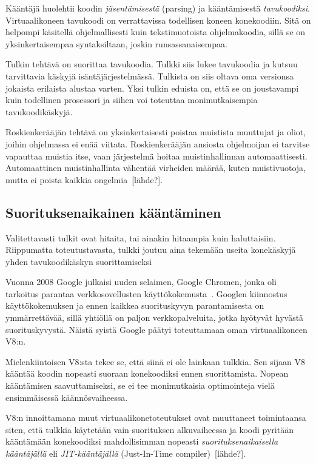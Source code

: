 Kääntäjä huolehtii koodin \textit{jäsentämisestä} (parsing) ja kääntämisestä \textit{tavukoodiksi}. Virtuaalikoneen tavukoodi on verrattavissa todellisen koneen konekoodiin. Sitä on helpompi käsitellä ohjelmallisesti kuin tekstimuotoista ohjelmakoodia, sillä se on yksinkertaisempaa syntaksiltaan, joskin runsassanaisempaa.

Tulkin tehtävä on suorittaa tavukoodia. Tulkki siis lukee tavukoodia ja kutsuu tarvittavia käskyjä isäntäjärjestelmässä. Tulkista on siis oltava oma versionsa jokaista erilaista alustaa varten. Yksi tulkin eduista on, että se on joustavampi kuin todellinen prosessori ja siihen voi toteuttaa monimutkaisempia tavukoodikäskyjä.

Roskienkerääjän tehtävä on yksinkertaisesti poistaa muistista muuttujat ja oliot, joihin ohjelmassa ei enää viitata. Roskienkerääjän ansiosta ohjelmoijan ei tarvitse vapauttaa muistia itse, vaan järjestelmä hoitaa muistinhallinnan automaattisesti. Automaattinen muistinhallinta vähentää virheiden määrää, kuten muistivuotoja, mutta ei poista kaikkia ongelmia~[lähde?].

\subsection{Suorituksenaikainen kääntäminen}

Valitettavasti tulkit ovat hitaita, tai ainakin hitaampia kuin haluttaisiin. Riippumatta toteutustavasta, tulkki joutuu aina tekemään useita konekäskyjä yhden tavukoodikäskyn suorittamiseksi~\cite[s.~35]{vms}

Vuonna 2008 Google julkaisi uuden selaimen, Google Chromen, jonka oli tarkoitus parantaa verkkosovellusten käyttökokemusta~\cite{chromepress}. Googlen kiinnostus käyttökokemuksen ja ennen kaikkea suorituskyvyn parantamisesta on ymmärrettävää, sillä yhtiöllä on paljon verkkopalveluita, jotka hyötyvät hyvästä suorituskyvystä. Näistä syistä Google päätyi toteuttamaan oman virtuaalikoneen V8:n.

Mielenkiintoisen V8:sta tekee se, että siinä ei ole lainkaan tulkkia. Sen sijaan V8 kääntää koodin nopeasti suoraan konekoodiksi ennen suorittamista. Nopean kääntämisen saavuttamiseksi, se ei tee monimutkaisia optimointeja vielä ensimmäisessä käännösvaiheessa.

V8:n innoittamana muut virtuaalikonetoteutukset ovat muuttaneet toimintaansa siten, että tulkkia käytetään vain suorituksen alkuvaiheessa ja koodi pyritään kääntämään konekoodiksi mahdollisimman nopeasti \textit{suorituksenaikaisella kääntäjällä} eli \textit{JIT-kääntäjällä} (Just-In-Time compiler)~[lähde?].

